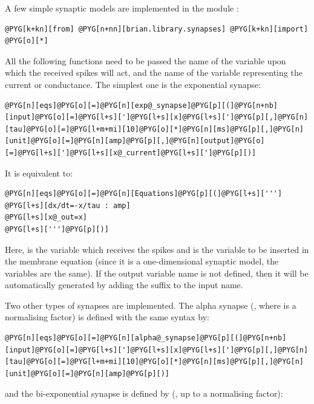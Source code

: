\documentclass[letterpaper,10pt,english]{manual}
\begin{document}
A few simple synaptic models are implemented in the module :

\begin{Verbatim}[commandchars=@\[\]]
@PYG[k+kn][from] @PYG[n+nn][brian.library.synapses] @PYG[k+kn][import] @PYG[o][*]
\end{Verbatim}

All the following functions need to be passed the name of the variable upon which the received spikes
will act, and the name of the variable representing the current or conductance.
The simplest one is the exponential synapse:

\begin{Verbatim}[commandchars=@\[\]]
@PYG[n][eqs]@PYG[o][=]@PYG[n][exp@_synapse]@PYG[p][(]@PYG[n+nb][input]@PYG[o][=]@PYG[l+s][']@PYG[l+s][x]@PYG[l+s][']@PYG[p][,]@PYG[n][tau]@PYG[o][=]@PYG[l+m+mi][10]@PYG[o][*]@PYG[n][ms]@PYG[p][,]@PYG[n][unit]@PYG[o][=]@PYG[n][amp]@PYG[p][,]@PYG[n][output]@PYG[o][=]@PYG[l+s][']@PYG[l+s][x@_current]@PYG[l+s][']@PYG[p][)]
\end{Verbatim}

It is equivalent to:

\begin{Verbatim}[commandchars=@\[\]]
@PYG[n][eqs]@PYG[o][=]@PYG[n][Equations]@PYG[p][(]@PYG[l+s][''']
@PYG[l+s][dx/dt=-x/tau : amp]
@PYG[l+s][x@_out=x]
@PYG[l+s][''']@PYG[p][)]
\end{Verbatim}

Here,  is the variable which receives the spikes and  is the variable to be inserted in
the membrane equation (since it is a one-dimensional synaptic model, the variables are the same).
If the output variable name is not defined, then it will be automatically generated by adding the
suffix  to the input name.

Two other types of synapses are implemented. The alpha synapse (, where
 is a normalising factor) is defined with the same syntax by:

\begin{Verbatim}[commandchars=@\[\]]
@PYG[n][eqs]@PYG[o][=]@PYG[n][alpha@_synapse]@PYG[p][(]@PYG[n+nb][input]@PYG[o][=]@PYG[l+s][']@PYG[l+s][x]@PYG[l+s][']@PYG[p][,]@PYG[n][tau]@PYG[o][=]@PYG[l+m+mi][10]@PYG[o][*]@PYG[n][ms]@PYG[p][,]@PYG[n][unit]@PYG[o][=]@PYG[n][amp]@PYG[p][)]
\end{Verbatim}

and the bi-exponential synapse is defined by (,
up to a normalising factor):
\end{document}
